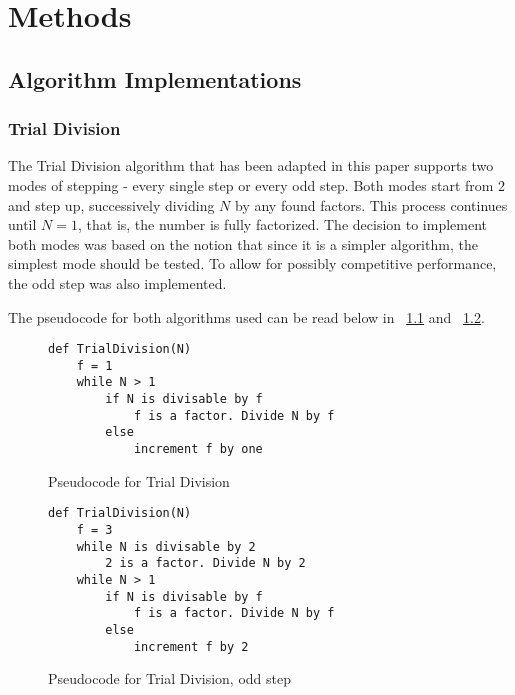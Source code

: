 \chapter{Methods}

\section{Algorithm Implementations}

\subsection{Trial Division}

The Trial Division algorithm that has been adapted in this paper supports two modes of stepping - every single step or every odd step. Both modes start from $2$ and step up, successively dividing $N$ by any found factors. This process continues until $N=1$, that is, the number is fully factorized. The decision to implement both modes was based on the notion that since it is a simpler algorithm, the simplest mode should be tested. To allow for possibly competitive performance, the odd step was also implemented.

The pseudocode for both algorithms used can be read below in ~\ref{fig:trialDivision1} and ~\ref{fig:trialDivision2}.

\begin{figure}[H]
    \centering
    \begin{minipage}{0.5\textwidth}
        \begin{verbatim}
def TrialDivision(N)
    f = 1
    while N > 1
        if N is divisable by f
            f is a factor. Divide N by f
        else
            increment f by one
        \end{verbatim}
    \end{minipage}
    \caption{Pseudocode for Trial Division}
    \label{fig:trialDivision1}
\end{figure}

\begin{figure}[H]
    \centering
    \begin{minipage}{0.5\textwidth}
        \begin{verbatim}
def TrialDivision(N)
    f = 3
    while N is divisable by 2
        2 is a factor. Divide N by 2
    while N > 1
        if N is divisable by f
            f is a factor. Divide N by f
        else
            increment f by 2
        \end{verbatim}
    \end{minipage}
    \caption{Pseudocode for Trial Division, odd step}
    \label{fig:trialDivision2}
\end{figure}

